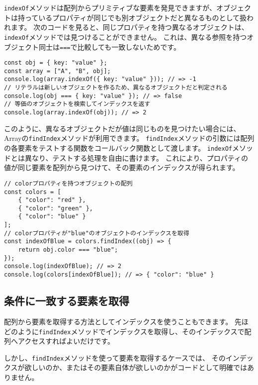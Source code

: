 \texttt{indexOf}メソッドは配列からプリミティブな要素を発見できますが、オブジェクトは持っているプロパティが同じでも別オブジェクトだと異なるものとして扱われます。
次のコードを見ると、同じプロパティを持つ異なるオブジェクトは、\texttt{indexOf}メソッドでは見つけることができません。
これは、異なる参照を持つオブジェクト同士は\texttt{===}で比較しても一致しないためです。

\begin{lstlisting}
const obj = { key: "value" };
const array = ["A", "B", obj];
console.log(array.indexOf({ key: "value" })); // => -1
// リテラルは新しいオブジェクトを作るため、異なるオブジェクトだと判定される
console.log(obj === { key: "value" }); // => false
// 等価のオブジェクトを検索してインデックスを返す
console.log(array.indexOf(obj)); // => 2
\end{lstlisting}

このように、異なるオブジェクトだが値は同じものを見つけたい場合には、Arrayの\texttt{findIndex}メソッドが利用できます。
\texttt{findIndex}メソッドの引数には配列の各要素をテストする関数をコールバック関数として渡します。
\texttt{indexOf}メソッドとは異なり、テストする処理を自由に書けます。
これにより、プロパティの値が同じ要素を配列から見つけて、その要素のインデックスが得られます。

\begin{lstlisting}
// colorプロパティを持つオブジェクトの配列
const colors = [
    { "color": "red" },
    { "color": "green" },
    { "color": "blue" }
];
// colorプロパティが"blue"のオブジェクトのインデックスを取得
const indexOfBlue = colors.findIndex((obj) => {
    return obj.color === "blue";
});
console.log(indexOfBlue); // => 2
console.log(colors[indexOfBlue]); // => { "color": "blue" }
\end{lstlisting}

\hypertarget{find}{%
\subsection{条件に一致する要素を取得}\label{find}}

配列から要素を取得する方法としてインデックスを使うこともできます。
先ほどのように\texttt{findIndex}メソッドでインデックスを取得し、そのインデックスで配列へアクセスすればよいだけです。

しかし、\texttt{findIndex}メソッドを使って要素を取得するケースでは、
そのインデックスが欲しいのか、またはその要素自体が欲しいのかがコードとして明確ではありません。

